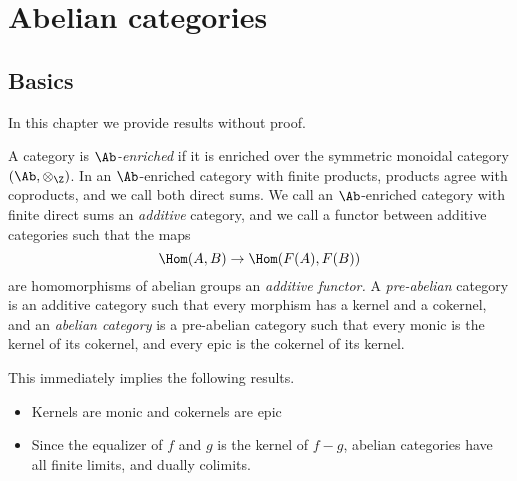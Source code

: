 \documentclass[main.tex]{subfiles}
\begin{document}
\chapter{Abelian categories}
\label{ch:abelian_categories}

\section{Basics}
\label{sec:basics}

In this chapter we provide results without proof.

A category is \emph{$\Ab$-enriched} if it is enriched over the symmetric monoidal category $(\Ab, \otimes_{\Z})$. In an $\Ab$-enriched category with finite products, products agree with coproducts, and we call both direct sums. We call an $\Ab$-enriched category with finite direct sums an \emph{additive} category, and we call a functor between additive categories such that the maps
\begin{equation*}
  \Hom(A, B) \to \Hom(F(A), F(B))
\end{equation*}
are homomorphisms of abelian groups an \emph{additive functor.} A \emph{pre-abelian} category is an additive category such that every morphism has a kernel and a cokernel, and an \emph{abelian category} is a pre-abelian category such that every monic is the kernel of its cokernel, and every epic is the cokernel of its kernel.

This immediately implies the following results.
\begin{itemize}
  \item Kernels are monic and cokernels are epic

  \item Since the equalizer of $f$ and $g$ is the kernel of $f-g$, abelian categories have all finite limits, and dually colimits.
\end{itemize}
\end{document}
